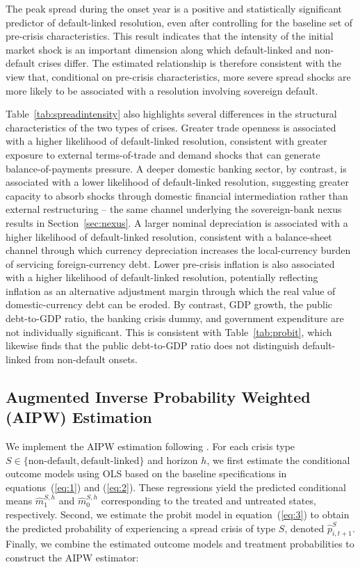 \documentclass[12pt]{article}
\begin{document}
\FloatBarrier

The peak spread during the onset year is a positive and statistically
significant predictor of default-linked resolution, even after
controlling for the baseline set of pre-crisis characteristics. This
result indicates that the intensity of the initial market shock is an
important dimension along which default-linked and non-default crises
differ. The estimated relationship is therefore consistent with the
view that, conditional on pre-crisis characteristics, more severe
spread shocks are more likely to be associated with a resolution
involving sovereign default.

Table~\ref{tab:spreadintensity} also highlights several differences in
the structural characteristics of the two types of crises. Greater
trade openness is associated with a higher likelihood of default-linked
resolution, consistent with greater exposure to external
terms-of-trade and demand shocks that can generate
balance-of-payments pressure. A deeper domestic banking sector, by
contrast, is associated with a lower likelihood of default-linked
resolution, suggesting greater capacity to absorb shocks through
domestic financial intermediation rather than external
restructuring -- the same channel underlying the sovereign-bank nexus
results in Section~\ref{sec:nexus}. A larger nominal depreciation is
associated with a higher likelihood of default-linked resolution,
consistent with a balance-sheet channel through which currency
depreciation increases the local-currency burden of servicing
foreign-currency debt. Lower pre-crisis inflation is also associated
with a higher likelihood of default-linked resolution, potentially
reflecting inflation as an alternative adjustment margin through which
the real value of domestic-currency debt can be eroded. By contrast,
GDP growth, the public debt-to-GDP ratio, the banking crisis dummy, and
government expenditure are not individually significant. This is
consistent with Table~\ref{tab:probit}, which likewise finds that the
public debt-to-GDP ratio does not distinguish default-linked from
non-default onsets.

\subsection{Augmented Inverse Probability Weighted (AIPW) Estimation}
\label{sec:aipw-subsection}

We implement the AIPW estimation following \citet{jorda2016time}. For
each crisis type $S \in \{\text{non-default}, \text{default-linked}\}$ and
horizon $h$, we first estimate the conditional outcome models using OLS
based on the baseline specifications in equations~(\ref{eq:1}) and
(\ref{eq:2}). These regressions yield the predicted conditional means
$\widehat{m}_1^{S,h}$ and $\widehat{m}_0^{S,h}$ corresponding to the
treated and untreated states, respectively. Second, we estimate the
probit model in equation~(\ref{eq:3}) to obtain the predicted probability
of experiencing a spread crisis of type $S$, denoted $\widehat{p}^S_{i,t+1}$.
Finally, we combine the estimated outcome models and treatment
probabilities to construct the AIPW estimator:
\end{document}
